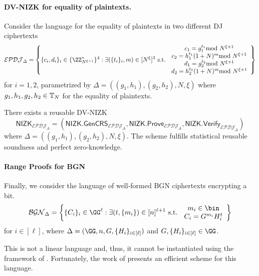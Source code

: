 \paragraph{DV-NIZK for equality of plaintexts.} 
Consider the language for the equality of plaintexts in two different DJ ciphertexts
$$    \mathcal{EPDJ}_\Delta= \left\{\{c_i,d_i\}_{i}\in \{\ZZ^\ast_{N^{\xi+1}}\}^4
:\exists (\{t_i\}_i,m)\in [N^\xi]^3 \text{ s.t. }
\begin{array}{c}
    c_1=g_1^{t_1}\smod N^{\xi+1}  \\
     c_2=h_1^{t_1}(1+N)^m\smod N^{\xi+1}\\
     d_1=g_2^{t_2}\smod N^{\xi+1}  \\
     d_2=h_2^{t_2}(1+N)^m\smod N^{\xi+1}
\end{array}
\right\}$$
for $i=1,2$, parametrized by $\Delta=((g_1,h_1),(g_2,h_2),N,\xi)$ where $g_1,h_1,g_2,h_2\in\mathbb{T}_N$ for the equality of plaintexts.%

\begin{lemma}
\label{lemma:EPDJ}
There exists a reusable DV-NIZK $$\mathsf{NIZK}_{\mathcal{EPDJ}_\Delta}=(\mathsf{NIZK.GenCRS}_{\mathcal{EPDJ}_\Delta},\mathsf{NIZK.Prove}_{\mathcal{EPDJ}_\Delta},\mathsf{NIZK.Verify}_{\mathcal{EPDJ}_\Delta})$$ where $\Delta=((g_1,h_1),(g_2,h_2),N,\xi)$. The scheme fulfills statistical reusable soundness and perfect zero-knowledge.
\end{lemma}




\paragraph{Range Proofs for BGN}
Finally, we consider the language of well-formed BGN ciphertexts encrypting a bit.
$$\mathcal{BGN}_\Delta=\left\{ \{C_i\}_i\in\GG^\ell
: \exists (t,\{m_i\})\in [n]^{\ell+1} \text{ s.t. } \begin{array}{c}
     m_i\in\bin  \\
     C_i=G^{m_i}H_i^t  
\end{array}\right\}$$ for $i\in [\ell]$, where $\Delta=(\GG,n,G,\{H_i\}_{i\in [\ell]})$ and $G,\{H_i\}_{i\in [\ell]}\in\GG$.

This is not a linear language and, thus, it cannot be instantiated using the framework of \cite{EC:CraSho02}. Fortunately, the work of \cite{EC:GroOstSah06} presents an efficient scheme for this language.


